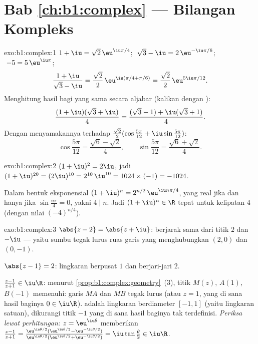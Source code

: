 \section*{Bab \ref{ch:b1:complex} --- Bilangan Kompleks}

\begin{solution}{exo:b1:complex:1}
$1 + \iu = \sqrt 2\, \eu^{\iu\pi/4}$;
$\;\sqrt 3 - \iu = 2\, \eu^{-\iu\pi/6}$;
$\;-5 = 5\, \eu^{\iu\pi}$;
\[
\frac{1 + \iu}{\sqrt 3 - \iu}
= \frac{\sqrt 2}{2}\, \eu^{\iu(\pi/4 + \pi/6)}
= \frac{\sqrt 2}{2}\, \eu^{5\iu\pi/12}.
\]
Menghitung hasil bagi yang sama secara aljabar (kalikan dengan ):
\[
\frac{(1 + \iu)(\sqrt 3 + \iu)}{4}
= \frac{(\sqrt 3 - 1) + \iu(\sqrt 3 + 1)}{4}.
\]
Dengan menyamakannya terhadap $\frac{\sqrt 2}{2}(\cos\frac{5\pi}{12} +
\iu\sin\frac{5\pi}{12})$:
\[
\cos\frac{5\pi}{12} = \frac{\sqrt 6 - \sqrt 2}{4},
\qquad
\sin\frac{5\pi}{12} = \frac{\sqrt 6 + \sqrt 2}{4}.
\]
\end{solution}

\begin{solution}{exo:b1:complex:2}
$(1+\iu)^2 = 2\iu$, jadi $(1+\iu)^{20} = (2\iu)^{10} = 2^{10}\,\iu^{10}
= 1024 \times (-1) = -1024$.

Dalam bentuk eksponensial $(1+\iu)^n = 2^{n/2}\, \eu^{\iu n\pi/4}$, yang real jika
dan hanya jika $\sin\frac{n\pi}{4} = 0$, yakni $4 \mid n$. Jadi $(1+\iu)^n
\in \R$ tepat untuk kelipatan $4$ (dengan nilai $(-4)^{n/4}$).
\end{solution}

\begin{solution}{exo:b1:complex:3}
$\abs{z - 2} = \abs{z + \iu}$: berjarak sama dari titik $2$ dan
$-\iu$ --- yaitu sumbu tegak lurus ruas garis yang menghubungkan $(2, 0)$
dan $(0, -1)$.

$\abs{z - 1} = 2$: lingkaran berpusat $1$ dan berjari-jari $2$.

$\frac{z-1}{z+1} \in \iu\R$: menurut
\cref{prop:b1:complex:geometry}~(3), titik $M(z)$, $A(1)$,
$B(-1)$ memenuhi: garis $MA$ dan $MB$ tegak lurus (atau $z = 1$, yang
di sana hasil baginya $0 \in \iu\R$).  adalah lingkaran berdiameter
$[-1, 1]$ (yaitu lingkaran satuan), dikurangi titik $-1$ yang di sana hasil baginya
tak terdefinisi. \emph{Periksa lewat perhitungan:} $z = \eu^{\iu\theta}$ memberikan
$\frac{z-1}{z+1} = \frac{\eu^{\iu\theta/2}(\eu^{\iu\theta/2} -
\eu^{-\iu\theta/2})}{\eu^{\iu\theta/2}(\eu^{\iu\theta/2} +
\eu^{-\iu\theta/2})} = \iu\tan\frac\theta2 \in \iu\R$.
\end{solution}

